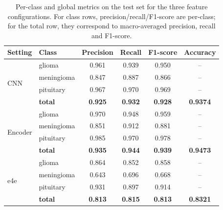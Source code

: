 \begin{table}[ht]
    \centering
    \caption{Per-class and global metrics on the test set for the three feature configurations. 
    For class rows, precision/recall/F1-score are per-class; for the total row, they correspond to macro-averaged precision, recall and F1-score.}
    \label{tab:exp2b_all_metrics}
    \begin{tabular}{llcccc}
        \toprule
        Setting        & Class       & Precision & Recall  & F1-score & Accuracy \\
        \midrule
        \multirow{4}{*}{CNN}
                       & glioma      & 0.961     & 0.939   & 0.950    & --       \\
                       & meningioma  & 0.847     & 0.887   & 0.866    & --       \\
                       & pituitary   & 0.967     & 0.970   & 0.969    & --       \\
        \cmidrule(lr){2-6}
                       & \textbf{total}     
                                    & \textbf{0.925} 
                                              & \textbf{0.932} 
                                                      & \textbf{0.928} 
                                                              & \textbf{0.9374}   \\
        \midrule
        \multirow{4}{*}{Encoder}
                       & glioma      & 0.970     & 0.948   & 0.959    & --       \\
                       & meningioma  & 0.851     & 0.912   & 0.881    & --       \\
                       & pituitary   & 0.985     & 0.970   & 0.978    & --       \\
        \cmidrule(lr){2-6}
                       & \textbf{total}     
                                    & \textbf{0.935} 
                                              & \textbf{0.944} 
                                                      & \textbf{0.939} 
                                                              & \textbf{0.9473}   \\ 
        \midrule
        \multirow{4}{*}{e4e}
                       & glioma      & 0.864     & 0.852   & 0.858    & --       \\
                       & meningioma  & 0.643     & 0.696   & 0.668    & --       \\
                       & pituitary   & 0.931     & 0.897   & 0.914    & --       \\
        \cmidrule(lr){2-6}
                       & \textbf{total}     
                                    & \textbf{0.813} 
                                              & \textbf{0.815} 
                                                      & \textbf{0.813} 
                                                              & \textbf{0.8321}   \\
        \bottomrule
    \end{tabular}
\end{table}


